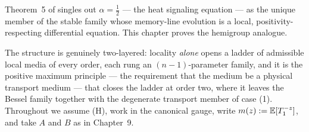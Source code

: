 %
%
%
%

Theorem~5 of  singles out $\alpha = \tfrac12$ --- the heat
signaling equation --- as the unique member of the stable family whose memory-line evolution is
a local, positivity-respecting differential equation. This chapter proves the hemigroup
analogue.

The structure is genuinely two-layered: locality \emph{alone} opens a ladder of admissible local
media of every order, each rung an $(n-1)$-parameter family, and it is the positive maximum
principle --- the requirement that the medium be a physical transport medium --- that closes the
ladder at order two, where it leaves the Bessel family together with the degenerate transport
member of case (1). Throughout we assume (H), work in the
canonical gauge, write $m(z) := \mathbb{E}[T_1^{-z}]$, and take $A$ and $B$ as in Chapter~9.


